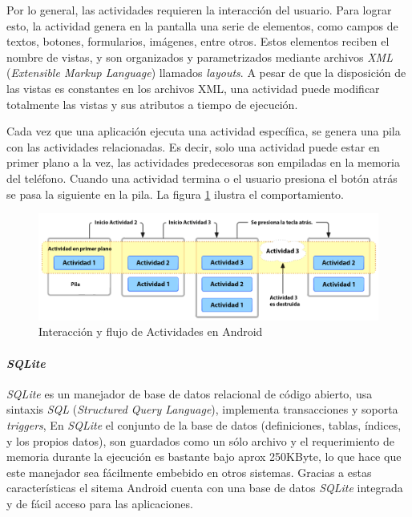 Por lo general, las actividades requieren la interacción del usuario. Para lograr esto, la actividad genera en la pantalla una serie de elementos, como campos de textos, botones, formularios, imágenes, entre otros. Estos elementos reciben el nombre de vistas, y son organizados y parametrizados mediante archivos \textit{XML} (\textit{Extensible Markup Language}) llamados \textit{layouts}. A pesar de que la disposición de las vistas es constantes en los archivos XML, una actividad puede modificar totalmente las vistas y sus atributos a tiempo de ejecución.

Cada vez que una aplicación ejecuta una actividad específica, se genera una pila con las actividades relacionadas. Es decir, solo una actividad puede estar en primer plano a la vez, las actividades predecesoras son empiladas en la memoria del teléfono. Cuando una actividad termina o el usuario presiona el botón atrás se pasa la siguiente en la pila. La figura \ref{fig:backstack} ilustra el comportamiento.

\begin{figure}[h]
	\begin{center}
		\includegraphics[scale=0.8]{imagenes/diagram_backstack.png}
	\end{center}
	\caption{
		\label{fig:backstack}
		Interacción y flujo de Actividades en Android \cite{TBS}
	}
\end{figure}

\paragraph{\textit{SQLite}} \mbox{}

\textit{SQLite} es un manejador de base de datos relacional de código abierto, usa sintaxis \textit{SQL} (\textit{Structured Query Language}), implementa transacciones y soporta \textit{triggers}, En \textit{SQLite} el conjunto de la base de datos (definiciones, tablas, índices, y los propios datos), son guardados como un sólo archivo y el requerimiento de memoria durante la ejecución es bastante bajo aprox 250KByte, lo que hace que este manejador sea fácilmente embebido en otros sistemas. Gracias a estas características el sitema Android cuenta con una base de datos \textit{SQLite} integrada y de fácil acceso para las aplicaciones.

